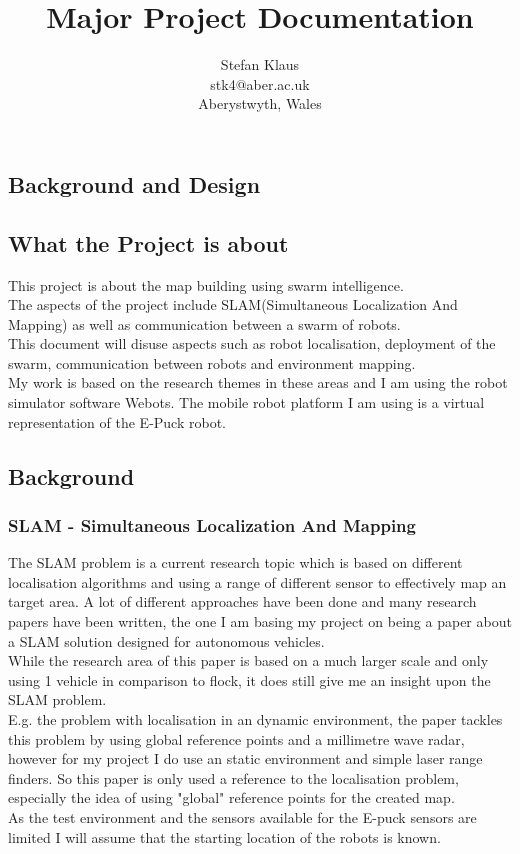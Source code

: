\documentclass[10pt,a4paper]{article}
\author{Stefan Klaus\\stk4@aber.ac.uk\\Aberystwyth, Wales}
\title{Major Project Documentation}
\begin{document}

\maketitle
\newpage
\tableofcontents
\newpage
\begin{flushleft}
\section{Background and Design}
\subsection{What the Project is about}
This project is about the map building using swarm intelligence.\\
The aspects of the project include SLAM(Simultaneous Localization And Mapping) as well as communication between a swarm of robots.\\
This document will disuse aspects such as robot localisation, deployment of the swarm, communication between robots and environment mapping.\\
My work is based on the research themes in these areas and I am using the robot simulator software Webots\textsuperscript{\texttrademark}. The mobile robot platform I am using is a virtual representation of the E-Puck robot. \\

\subsection{Background}
\subsubsection{SLAM - Simultaneous Localization And Mapping}
The SLAM problem is a current research topic which is based on different localisation algorithms and using a range of different sensor to effectively map an target area. A lot of different approaches have been done and many research papers have been written, the one I am basing my project on being a paper about a SLAM solution designed for autonomous vehicles\cite{Dissanayake2001Solution}.\\
While the research area of this paper is based on a much larger scale and only using 1 vehicle in comparison to flock, it does still give me an insight upon the SLAM problem.\\
E.g. the problem with localisation in an dynamic environment, the paper tackles this problem by using global reference points and a millimetre wave radar, however for my project I do use an static environment and simple laser range finders. So this paper is only used a reference to the localisation problem, especially the idea of using "global" reference points for the created map.\\
As the test environment and the sensors available for the E-puck sensors are limited I will assume that the starting location of the robots is known.\\[3ex]


\end{flushleft}
\end{document}
